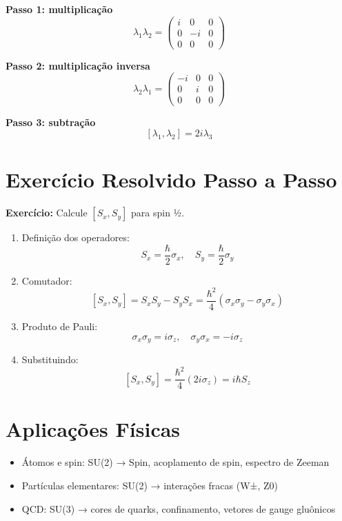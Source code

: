 \documentclass[12pt,a4paper]{article}
\begin{document}
\textbf{Passo 1: multiplicação}
\[
\lambda_1 \lambda_2 = \begin{pmatrix} i & 0 & 0\\ 0 & -i & 0\\ 0 & 0 & 0 \end{pmatrix}
\]

\textbf{Passo 2: multiplicação inversa}
\[
\lambda_2 \lambda_1 = \begin{pmatrix}-i & 0 & 0\\0 & i &0\\0 &0 &0\end{pmatrix}
\]

\textbf{Passo 3: subtração}
\[
[\lambda_1, \lambda_2] = 2 i \lambda_3
\]

\section{Exercício Resolvido Passo a Passo}

\textbf{Exercício:} Calcule $[S_x, S_y]$ para spin ½.

\begin{enumerate}
    \item Definição dos operadores:
    \[
    S_x = \frac{\hbar}{2}\sigma_x, \quad S_y = \frac{\hbar}{2}\sigma_y
    \]
    
    \item Comutador:
    \[
    [S_x, S_y] = S_x S_y - S_y S_x = \frac{\hbar^2}{4} (\sigma_x \sigma_y - \sigma_y \sigma_x)
    \]
    
    \item Produto de Pauli:
    \[
    \sigma_x \sigma_y = i \sigma_z, \quad \sigma_y \sigma_x = -i \sigma_z
    \]
    
    \item Substituindo:
    \[
    [S_x, S_y] = \frac{\hbar^2}{4} (2 i \sigma_z) = i \hbar S_z
    \]
\end{enumerate}

\section{Aplicações Físicas}
\begin{itemize}
    \item Átomos e spin: SU(2) → Spin, acoplamento de spin, espectro de Zeeman  
    \item Partículas elementares: SU(2) → interações fracas (W±, Z0)  
    \item QCD: SU(3) → cores de quarks, confinamento, vetores de gauge gluônicos
\end{itemize}
\end{document}
